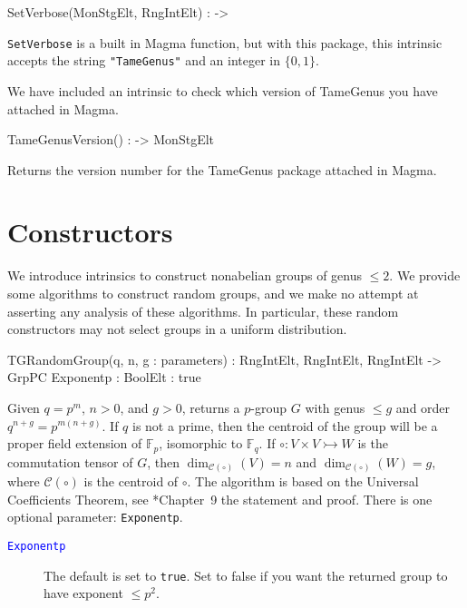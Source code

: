\documentclass{documentation}
\begin{document}
\begin{intrinsics}
SetVerbose(MonStgElt, RngIntElt) : -> 
\end{intrinsics}

{\tt SetVerbose} is a built in Magma function, but with this package, this intrinsic accepts the string {\tt "TameGenus"} and an integer in $\{0,1\}$. 

We have included an intrinsic to check which version of TameGenus you have attached in Magma.

\begin{intrinsics}
TameGenusVersion() : -> MonStgElt
\end{intrinsics}

Returns the version number for the TameGenus package attached in Magma.


\chapter{Constructors}

We introduce intrinsics to construct nonabelian groups of genus $\leq 2$. 
We provide some algorithms to construct random groups, and we make no attempt at asserting any analysis of these algorithms.
In particular, these random constructors may not select groups in a uniform distribution. 

\begin{intrinsics}
TGRandomGroup(q, n, g : parameters) : RngIntElt, RngIntElt, RngIntElt -> GrpPC
    Exponentp : BoolElt : true
\end{intrinsics}

Given $q=p^m$, $n>0$, and $g>0$, returns a $p$-group $G$ with genus $\leq g$ and order $q^{n+g}=p^{m(n+g)}$. 
If $q$ is not a prime, then the centroid of the group will be a proper field extension of $\mathbb{F}_p$, isomorphic to $\mathbb{F}_q$. 
If $\circ: V\times V\rightarrowtail W$ is the commutation tensor of $G$, then $\dim_{\mathcal{C}(\circ)}(V)=n$ and $\dim_{\mathcal{C}(\circ)}(W)=g$, where $\mathcal{C}(\circ)$ is the centroid of $\circ$. 
The algorithm is based on the Universal Coefficients Theorem, see \cite{LGM:book}*{Chapter~9} the statement and proof.
There is one optional parameter: {\tt Exponentp}. 

\begin{description}
\item[\textcolor{blue}{\tt Exponentp}]
The default is set to {\tt true}.
Set to false if you want the returned group to have exponent $\leq p^2$.  
\end{description}
\end{document}
